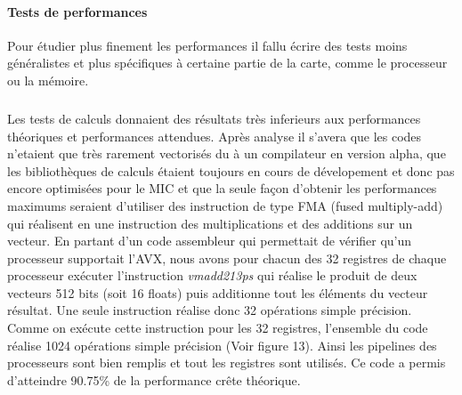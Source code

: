 \documentclass{article}
\begin{document}
				\paragraph{Tests de performances}
				Pour étudier plus finement les performances il fallu écrire des tests moins généralistes et plus spécifiques
				à certaine partie de la carte, comme le processeur ou la mémoire.
					\subparagraph{}
					Les tests de calculs donnaient des résultats très inferieurs aux performances théoriques et performances 
					attendues. Après analyse il s'avera que les codes n'etaient que très rarement vectorisés du à un compilateur 
					en version alpha, que les bibliothèques de calculs étaient toujours en cours de dévelopement et donc pas 
					encore optimisées pour le MIC et que la seule façon d'obtenir les performances maximums seraient d'utiliser
					des instruction de type FMA (fused multiply-add) qui réalisent en une instruction des multiplications et 
					des additions sur un vecteur. \newline
					En partant d'un code assembleur qui permettait de vérifier qu'un processeur supportait l'AVX, nous avons 
					pour chacun des 32 registres de chaque processeur exécuter l'instruction \emph{vmadd213ps} qui réalise le 
					produit de deux vecteurs 512 bits (soit 16 floats) puis additionne tout les éléments du vecteur résultat.
					Une seule instruction réalise donc 32 opérations simple précision.
					Comme on exécute cette instruction pour les 32 registres, l'ensemble du code réalise 1024 opérations simple
					précision (Voir figure 13). Ainsi les pipelines des processeurs sont bien remplis et tout les registres sont
					utilisés. Ce code a permis d'atteindre 90.75\% de la performance crête théorique.
\end{document}
